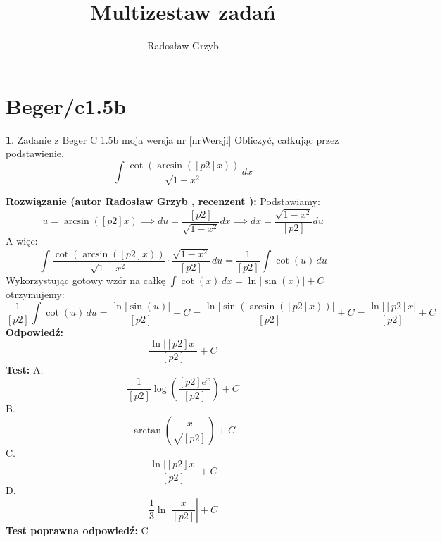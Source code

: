 \documentclass[12pt, a4paper]{article}
\title{Multizestaw zadań}
\author{Radosław Grzyb}
\date{}
\theoremstyle{definition} %
\newtheorem{zad}{}
\newcommand{\kategoria}[1]{\section{#1}} %
\newcommand{\zadStart}[1]{\begin{zad}#1\newline} %
\newcommand{\zadStop}{\end{zad}}   %
\newcommand{\rozwStart}[2]{\noindent \textbf{Rozwiązanie (autor #1 , recenzent #2): }\newline} %
\newcommand{\rozwStop}{\newline}                                            %
\newcommand{\odpStart}{\noindent \textbf{Odpowiedź:}\newline}    %
\newcommand{\odpStop}{\newline}                                             %
\newcommand{\testStart}{\noindent \textbf{Test:}\newline} %
\newcommand{\testStop}{\newline} %
\newcommand{\kluczStart}{\noindent \textbf{Test poprawna odpowiedź:}\newline} %
\newcommand{\kluczStop}{\newline} %
\begin{document}
\maketitle
\kategoria{Beger/c1.5b}
\zadStart{Zadanie z Beger C 1.5b moja wersja nr [nrWersji]}
Obliczyć, całkując przez podstawienie.
$$\int \frac{\cot(\arcsin([p2]x))}{\sqrt{1-x^2}} \,dx$$
\zadStop
\rozwStart{Radosław Grzyb}{}
Podstawiamy:
$$u=\arcsin([p2]x) \implies du=\frac{[p2]}{\sqrt{1-x^2}}dx \implies dx=\frac{\sqrt{1-x^2}}{[p2]}du$$
A więc:
$$\int \frac{\cot(\arcsin([p2]x))}{\sqrt{1-x^2}}\cdot\frac{\sqrt{1-x^2}}{[p2]} \,du=\frac{1}{[p2]}\int \cot(u) \,du$$
Wykorzystując gotowy wzór na całkę $\int \cot(x) \,dx=\ln|\sin(x)|+C$ otrzymujemy:
$$\frac{1}{[p2]}\int \cot(u) \,du=\frac{\ln|\sin(u)|}{[p2]}+C=\frac{\ln|\sin(\arcsin([p2]x))|}{[p2]}+C=\frac{\ln|[p2]x|}{[p2]}+C$$
\rozwStop
\odpStart
$$\frac{\ln|[p2]x|}{[p2]}+C$$
\odpStop
\testStart
A.$$\frac{1}{[p2]}\log(\frac{[p2]e^{x}}{[p2]})+C$$
B.$$\arctan(\frac{x}{\sqrt{[p2]}})+C$$
C.$$\frac{\ln|[p2]x|}{[p2]}+C$$
D.$$\frac{1}{3}\ln|\frac{x}{[p2]}|+C$$
\testStop
\kluczStart
C
\kluczStop
\end{document}
